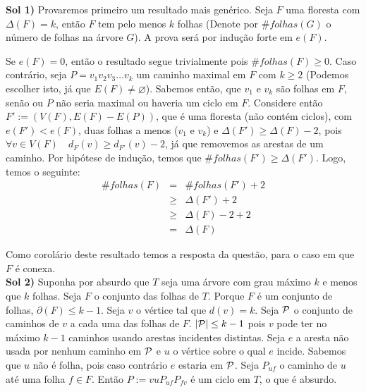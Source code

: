 
 {\bf Sol 1)} Provaremos primeiro um resultado mais genérico.
%
Seja $F$ uma floresta com $\Delta(F) = k$, então $F$ tem pelo menos $k$ folhas (Denote por $\# folhas(G)$ o número de folhas na árvore $G$). A prova será por indução forte em $e(F)$.

Se $e(F) = 0$, então o resultado segue trivialmente pois $\# folhas(F) \ge 0$.
%
Caso contrário, seja $P = v_1v_2v_3\ldots v_k$ um caminho maximal em $F$ com $k \ge 2$ (Podemos escolher isto, já que $E(F) \ne \varnothing$).
%
Sabemos então, que $v_1$ e $v_k$ são folhas em $F$, senão ou $P$ não seria maximal ou haveria um ciclo em $F$.
%
Considere então $F' := (V(F),E(F)-E(P))$, que é uma floresta (não contém ciclos), com $e(F') < e(F)$, duas folhas a menos ($v_1$ e $v_k$) e $\Delta(F') \ge \Delta(F) - 2$, pois $\forall v\in V(F)\quad d_F(v) \ge d_{F'}(v) - 2$, já que removemos as arestas de um caminho.
%
Por hipótese de indução, temos que $\# folhas(F') \ge \Delta(F')$.
%
Logo, temos o seguinte: 
\begin{eqnarray}
	\#folhas(F) &=& \# folhas(F') + 2  \nonumber \\
		  &\ge& \Delta(F') + 2 	   \nonumber \\
		  &\ge& \Delta(F) - 2 + 2  \nonumber \\
		    &=& \Delta(F) \nonumber
\end{eqnarray}
\fimprova

Como corolário deste resultado temos a resposta da questão, para o caso em que $F$ é conexa.\\

{\bf Sol 2)} Suponha por absurdo que $T$ seja uma árvore com grau máximo $k$ e
menos que $k$ folhas. Seja $F$ o conjunto das folhas de $T$. Porque $F$ é um
conjunto de folhas, $\partial(F) \le k - 1$. Seja $v$ o vértice tal que
$d(v) = k$. Seja ${\cal P}$  o conjunto de caminhos de $v$ a cada uma das folhas
de $F$. $|{\cal P}| \le k - 1$ pois $v$ pode ter no máximo $k-1$ caminhos usando
arestas incidentes distintas. Seja $e$ a aresta não usada por nenhum caminho em
${\cal P}$ e $u$ o vértice sobre o qual $e$ incide. Sabemos que $u$ não é folha,
pois caso contrário $e$ estaria em ${\cal P}$. Seja $P_{uf}$ o caminho de $u$ até
uma folha $f \in F$. Então $P:=vuP_{uf}P_{fv}$ é um ciclo em $T$, o que é absurdo.
\fimprova

